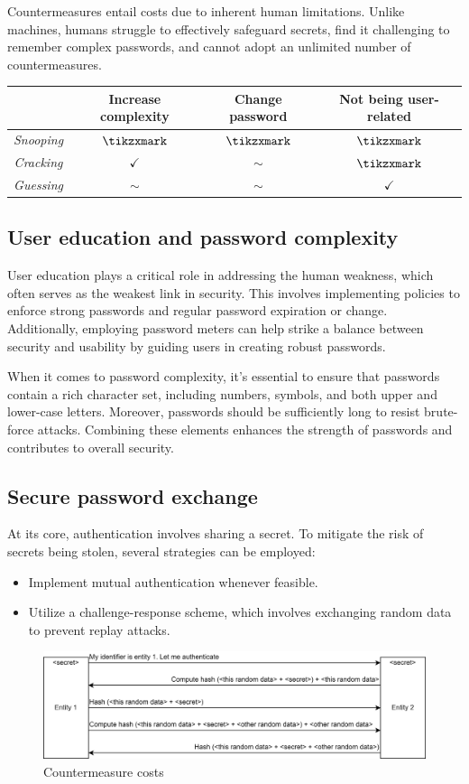 Countermeasures entail costs due to inherent human limitations. 
Unlike machines, humans struggle to effectively safeguard secrets, find it challenging to remember complex passwords, and cannot adopt an unlimited number of countermeasures.
\begin{table}[H]
    \centering
    \begin{tabular}{c|ccc}
                      & \textbf{Increase complexity} & \textbf{Change password} & \textbf{Not being user-related} \\ \hline
    \textit{Snooping} & $\tikzxmark$                 & $\tikzxmark$             & $\tikzxmark$          \\
    \textit{Cracking} & $\checkmark$                 & $\sim$                   & $\tikzxmark$          \\
    \textit{Guessing} & $\sim$                       & $\sim$                   & $\checkmark$    
    \end{tabular}
\end{table}

\subsection{User education and password complexity}
User education plays a critical role in addressing the human weakness, which often serves as the weakest link in security. 
This involves implementing policies to enforce strong passwords and regular password expiration or change. 
Additionally, employing password meters can help strike a balance between security and usability by guiding users in creating robust passwords.

When it comes to password complexity, it's essential to ensure that passwords contain a rich character set, including numbers, symbols, and both upper and lower-case letters. 
Moreover, passwords should be sufficiently long to resist brute-force attacks. 
Combining these elements enhances the strength of passwords and contributes to overall security.

\subsection{Secure password exchange}
At its core, authentication involves sharing a secret. To mitigate the risk of secrets being stolen, several strategies can be employed:
\begin{itemize}
    \item Implement mutual authentication whenever feasible.
    \item Utilize a challenge-response scheme, which involves exchanging random data to prevent replay attacks.
\end{itemize}
\begin{figure}[H]
    \centering
    \includegraphics[width=0.75\linewidth]{images/auth2.png}
    \caption{Countermeasure costs}
\end{figure}

